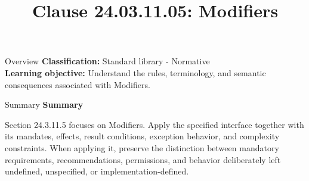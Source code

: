 \documentclass[10pt,letterpaper]{article}
\title{Clause 24.03.11.05: Modifiers}
\author{}
\date{}
\begin{document}
\maketitle
\begin{CornellOverviewBox}{Overview}
\textbf{Classification:} Standard library - Normative\\[2pt]
\textbf{Learning objective:} Understand the rules, terminology, and semantic consequences associated with Modifiers.
\end{CornellOverviewBox}\begin{CornellSummaryBox}{Summary}
{\sffamily\bfseries\color{Accent} Summary}\par\vspace{3pt}Section 24.3.11.5 focuses on Modifiers. Apply the specified interface together with its mandates, effects, result conditions, exception behavior, and complexity constraints. When applying it, preserve the distinction between mandatory requirements, recommendations, permissions, and behavior deliberately left undefined, unspecified, or implementation-defined.
\end{CornellSummaryBox}
\end{document}

